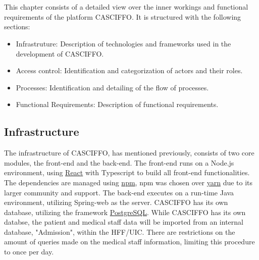 \setlength{\headheight}{14.49998pt}
\chapter{}\label{ch:functionalities}

This chapter consists of a detailed view over the inner workings and functional requirements of the platform CASCIFFO.
It is structured with the following sections:
\begin{itemize}
    \item Infrastruture: Description of technologies and frameworks used in the development of CASCIFFO. 
    \item Access control: Identification and categorization of actors and their roles.
    \item Processes: Identification and detailing of the flow of processes.
    \item Functional Requirements: Description of functional requirements.
\end{itemize}


\section{Infrastructure}
\label{sec:infrastructure}
The infrastructure of CASCIFFO, has mentioned previously, consists of two core modules, the front-end and the back-end.  
The front-end runs on a Node.js environment, using \href{https://reactjs.org/}{React} with Typescript to build all front-end functionalities. The dependencies are managed using \href{https://docs.npmjs.com/about-npm}{npm}, npm was chosen over \href{https://yarnpkg.com/}{yarn} due to its larger community and support.
The back-end executes on a run-time Java environment, utilizing Spring-web as the server. CASCIFFO has its own database, utilizing the framework \href{https://www.postgresql.org/}{PostgreSQL}. While CASCIFFO has its own databse, the patient and medical staff data will be imported from an internal database, "Admission", within the HFF/UIC. There are restrictions on the amount of queries made on the medical staff information, limiting this procedure to once per day.

